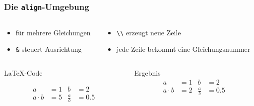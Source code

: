 \begin{frame}[fragile]
    \frametitle{Die \texttt{align}-Umgebung \hfill{}}
    \begin{columns}[t]
        \begin{column}{0.35\textwidth}
            \begin{itemize}
                \item für mehrere Gleichungen
                \item \texttt{\&} steuert Ausrichtung
            \end{itemize}
        \end{column}
        \begin{column}{0.6\textwidth}
            \begin{itemize}
                \item \texttt{\textbackslash\textbackslash} erzeugt neue Zeile
                \item jede Zeile bekommt eine Gleichungsnummer
            \end{itemize}
        \end{column}
    \end{columns}
    \vfill
    \begin{columns}[T]
        \begin{column}{0.65\textwidth}
            \begin{block}{\LaTeX-Code}
                \begin{lstverbatim}
                \begin{align}
                    a        &= 1 & b           &= 2 \\
                    a\cdot b &= 5 & \frac{a}{b} &= \num{0,5}
                \end{align}
                \end{lstverbatim}
            \end{block}
        \end{column}
        \begin{column}{0.3\textwidth}
            \begin{block}{Ergebnis}
                \begin{align}
                    a        &= 1 & b           &= 2 \\
                    a\cdot b &= 2 & \frac{a}{b} &= \num{0,5}
                \end{align}
            \end{block}
        \end{column}
    \end{columns}
\end{frame}
